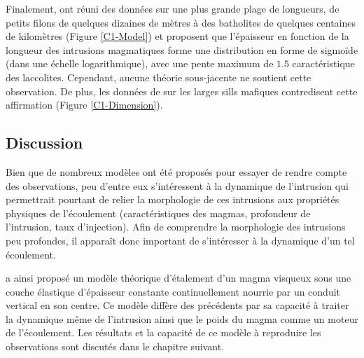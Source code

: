 Finalement, \citet{Nachwuchskoechin:2002tv} ont réuni des données sur
une plus grande plage de longueurs, de petits filons de quelques
dizaines de mètres à des batholites de quelques centaines de
kilomètres (Figure \ref{C1-Model}) et proposent que l'épaisseur en
fonction de la longueur des intrusions magmatiques forme une
distribution en forme de sigmoïde (dans une échelle logarithmique),
avec une pente maximum de $1.5$ caractéristique des laccolites.
Cependant, aucune théorie sous-jacente ne soutient cette observation.
De plus, les données de \citet{Cruden:tg} sur les larges sills
mafiques contredisent cette affirmation (Figure \ref{C1-Dimension}).

\subsection{Discussion}
\label{C1-sec:conclusion}

Bien que de  nombreux modèles ont été proposés pour  essayer de rendre
compte des observations, peu d'entre  eux s'intéressent à la dynamique
de l'intrusion  qui permettrait pourtant  de relier la  morphologie de
ces    intrusions   aux    propriétés   physiques    de   l'écoulement
(caractéristiques   des  magmas,   profondeur  de   l'intrusion,  taux
d'injection).  Afin de  comprendre la  morphologie des  intrusions peu
profondes, il apparaît  donc important de s'intéresser  à la dynamique
d'un tel écoulement.

\citet{Michaut:2011kg} a ainsi proposé un modèle théorique d'étalement
d'un magma visqueux sous une couche élastique d'épaisseur constante
continuellement nourrie par un conduit vertical en son centre. Ce
modèle diffère des précédents par sa capacité à traiter la dynamique
même de l'intrusion ainsi que le poids du magma comme un moteur de
l'écoulement. Les résultats et la capacité de ce modèle à reproduire
les observations sont discutés dans le chapitre suivant.

